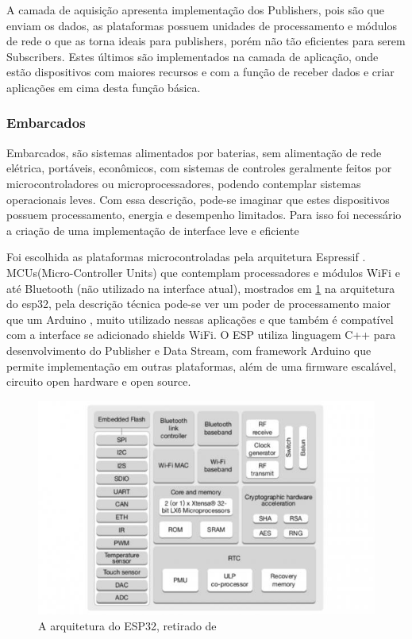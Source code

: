 A camada de aquisição apresenta implementação dos Publishers, pois são que enviam os dados, as plataformas possuem unidades de processamento e módulos de rede o que as torna ideais para publishers, porém não tão eficientes para serem Subscribers. Estes últimos são implementados na camada de aplicação, onde estão dispositivos com maiores recursos e com a função de receber dados e criar aplicações em cima desta função básica.

\subsubsection{Embarcados}
\label{subsubsection:embarcados}

Embarcados, são sistemas alimentados por baterias, sem alimentação de rede elétrica, portáveis, econômicos, com sistemas de controles geralmente feitos por microcontroladores ou microprocessadores, podendo contemplar sistemas operacionais leves. Com essa descrição, pode-se imaginar que estes dispositivos possuem processamento, energia e desempenho limitados. Para isso foi necessário a criação de uma implementação de interface leve e eficiente

Foi escolhida as plataformas microcontroladas pela arquitetura Espressif \cite{espressif}. MCUs(Micro-Controller Units) que contemplam processadores e módulos WiFi e até Bluetooth (não utilizado na interface atual), mostrados em \ref{fig:3.3.4/esp32-arch} na arquitetura do esp32, pela descrição técnica pode-se ver um poder de processamento maior que um Arduino \cite{arduino}, muito utilizado nessas aplicações e que também é compatível com a interface se adicionado shields WiFi. O ESP utiliza linguagem C++ \cite{c++} para desenvolvimento do Publisher e Data Stream, com framework Arduino que permite implementação em outras plataformas, além de uma firmware escalável, circuito open hardware e open source.

\begin{figure}[h!]
\centering
\includegraphics[width=13cm]{./02_Capitulos/02_Cap3/figures/espressif32-arch}
\caption{A arquitetura do ESP32, retirado de \cite{espressif}}
\label{fig:3.3.4/esp32-arch}
\end{figure}


